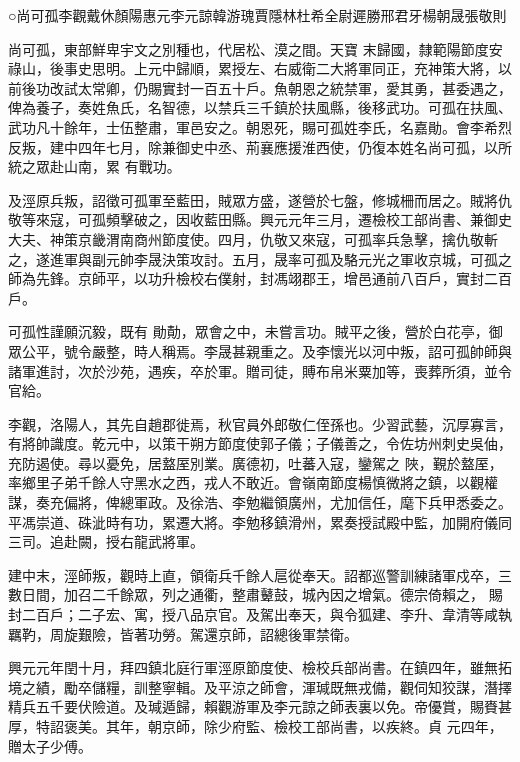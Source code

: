 
\begin{pinyinscope}

 ○尚可孤李觀戴休顏陽惠元李元諒韓游瑰賈隱林杜希全尉遲勝邢君牙楊朝晟張敬則



 尚可孤，東部鮮卑宇文之別種也，代居松、漠之間。天寶
 末歸國，隸範陽節度安祿山，後事史思明。上元中歸順，累授左、右威衛二大將軍同正，充神策大將，以前後功改試太常卿，仍賜實封一百五十戶。魚朝恩之統禁軍，愛其勇，甚委遇之，俾為養子，奏姓魚氏，名智德，以禁兵三千鎮於扶風縣，後移武功。可孤在扶風、武功凡十餘年，士伍整肅，軍邑安之。朝恩死，賜可孤姓李氏，名嘉勛。會李希烈反叛，建中四年七月，除兼御史中丞、荊襄應援淮西使，仍復本姓名尚可孤，以所統之眾赴山南，累
 有戰功。



 及涇原兵叛，詔徵可孤軍至藍田，賊眾方盛，遂營於七盤，修城柵而居之。賊將仇敬等來寇，可孤頻擊破之，因收藍田縣。興元元年三月，遷檢校工部尚書、兼御史大夫、神策京畿渭南商州節度使。四月，仇敬又來寇，可孤率兵急擊，擒仇敬斬之，遂進軍與副元帥李晟決策攻討。五月，晟率可孤及駱元光之軍收京城，可孤之師為先鋒。京師平，以功升檢校右僕射，封馮翊郡王，增邑通前八百戶，實封二百戶。



 可孤性謹願沉毅，既有
 勛勣，眾會之中，未嘗言功。賊平之後，營於白花亭，御眾公平，號令嚴整，時人稱焉。李晟甚親重之。及李懷光以河中叛，詔可孤帥師與諸軍進討，次於沙苑，遇疾，卒於軍。贈司徒，賻布帛米粟加等，喪葬所須，並令官給。



 李觀，洛陽人，其先自趙郡徙焉，秋官員外郎敬仁侄孫也。少習武藝，沉厚寡言，有將帥識度。乾元中，以策干朔方節度使郭子儀；子儀善之，令佐坊州刺史吳伷，充防遏使。尋以憂免，居盩厔別業。廣德初，吐蕃入寇，鑾駕之
 陜，覲於盩厔，率鄉里子弟千餘人守黑水之西，戎人不敢近。會嶺南節度楊慎微將之鎮，以觀權謀，奏充偏將，俾總軍政。及徐浩、李勉繼領廣州，尤加信任，麾下兵甲悉委之。平馮崇道、硃泚時有功，累遷大將。李勉移鎮滑州，累奏授試殿中監，加開府儀同三司。追赴闕，授右龍武將軍。



 建中末，涇師叛，觀時上直，領衛兵千餘人扈從奉天。詔都巡警訓練諸軍戍卒，三數日間，加召二千餘眾，列之通衢，整肅鼙鼓，城內因之增氣。德宗倚賴之，
 賜封二百戶；二子宏、寓，授八品京官。及駕出奉天，與令狐建、李升、韋清等咸執羈靮，周旋艱險，皆著功勞。駕還京師，詔總後軍禁衛。



 興元元年閏十月，拜四鎮北庭行軍涇原節度使、檢校兵部尚書。在鎮四年，雖無拓境之績，勵卒儲糧，訓整寧輯。及平涼之師會，渾瑊既無戎備，觀伺知狡謀，潛擇精兵五千要伏險道。及瑊遁歸，賴觀游軍及李元諒之師表裏以免。帝優賞，賜賚甚厚，特詔褒美。其年，朝京師，除少府監、檢校工部尚書，以疾終。貞
 元四年，贈太子少傅。




\end{pinyinscope}
